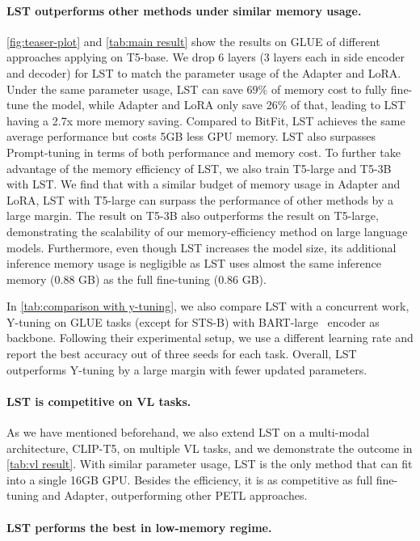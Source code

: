 \paragraph{LST outperforms other methods under similar memory usage.}
 \ref{fig:teaser-plot} and \ref{tab:main result} show the results on GLUE of different approaches applying on T5-base. We drop 6 layers (3 layers each in side encoder and decoder) for LST to match the parameter usage of the Adapter and LoRA. Under the same parameter usage, LST can save $69\%$ of memory cost to fully fine-tune the model, while Adapter and LoRA only save 26\% of that, leading to LST having a 2.7x more memory saving. Compared to BitFit, LST achieves the same average performance but costs 5GB less GPU memory. LST also surpasses Prompt-tuning in terms of both performance and memory cost. To further take advantage of the memory efficiency of LST, we also train T5-large and T5-3B with LST. We find that with a similar budget of memory usage in Adapter and LoRA, LST with T5-large can surpass the performance of other methods by a large margin. The result on T5-3B also outperforms the result on T5-large, demonstrating the scalability of our memory-efficiency method on large language models. Furthermore, even though LST increases the model size, its additional inference memory usage is negligible as LST uses almost the same inference memory (0.88 GB) as the full fine-tuning (0.86 GB).

In \ref{tab:comparison with y-tuning}, we also compare LST with a concurrent work, Y-tuning \cite{Liu2022YTuningAE} on GLUE tasks (except for STS-B) with BART-large~\cite{Lewis2020BARTDS} encoder as backbone. Following their experimental setup, we use a different learning rate and report the best accuracy out of three seeds for each task. Overall, LST outperforms Y-tuning by a large margin with fewer updated parameters. 

\paragraph{LST is competitive on VL tasks.} As we have mentioned beforehand, we also extend LST on a multi-modal architecture, CLIP-T5, on multiple VL tasks, and we demonstrate the outcome in \ref{tab:vl result}. With similar parameter usage, LST is the only method that can fit into a single 16GB GPU. Besides the efficiency, it is as competitive as full fine-tuning and Adapter, outperforming other PETL approaches.

\paragraph{LST performs the best in low-memory regime.}

